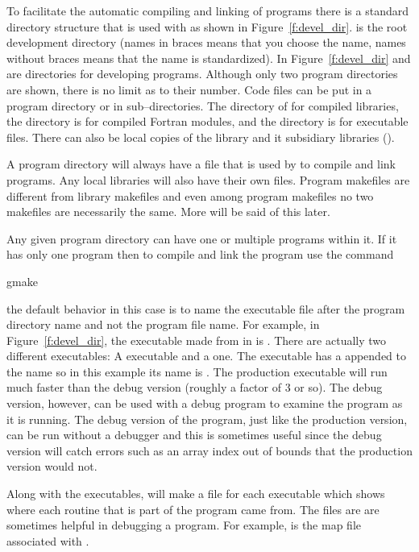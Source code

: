 To facilitate the automatic compiling and linking of programs there
is a standard directory structure that is used with \bmad as shown in
Figure~\ref{f:devel_dir}.  is the root development
directory (names in braces  means that you choose the name,
names without braces means that the name is standardized). In
Figure~\ref{f:devel_dir}  and 
are directories for developing programs. Although only two program
directories are shown, there is no limit as to their number. Code
files can be put in a program directory or in sub--directories. The
 directory of for compiled libraries, the 
directory is for compiled Fortran modules, and the  directory
is for executable files. There can also be local copies of the
 library and it subsidiary libraries ().

A program directory will always have a  file that is used
by  to compile and link programs. Any local libraries will
also have their own  files. Program makefiles are
different from library makefiles and even among program makefiles no
two makefiles are necessarily the same. More will be said of this
later.

Any given program directory can have one or multiple programs within
it. If it has only one program then to compile and link the program
use the command
\begin{example}
  gmake
\end{example}
the default  behavior in this case is to name the executable
file after the program directory name and not the program file
name. For example, in Figure~\ref{f:devel_dir}, the executable made
from  in  is
. There are actually two different executables:
A  executable and a  one. The 
executable has a  appended to the name so in this example its
name is .  The production executable will run
much faster than the debug version (roughly a factor of 3 or so). The
debug version, however, can be used with a debug program to examine
the program as it is running.  The debug version of the program, just
like the production version, can be run without a debugger and this is
sometimes useful since the debug version will catch errors such as an
array index out of bounds that the production version would not.

Along with the executables,  will make a  file for
each executable which shows where each routine that is part of the
program came from. The  files are are sometimes helpful in
debugging a program. For example,  is the
map file associated with .

